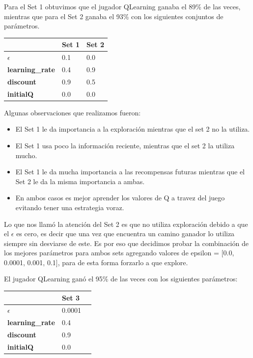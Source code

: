 Para el Set 1 obtuvimos que el jugador QLearning ganaba el 89\% de las veces, mientras que para el Set 2 ganaba el 93\% con los siguientes conjuntos de parámetros.

\begin{center}
    \begin{tabular}{| l | l | l |}
    \hline
     					    &  \textbf{Set 1} & \textbf{Set 2} \\ \hline
    \textbf{$\epsilon$}     &  0.1   		  & 0.0   \\
    \textbf{learning\_rate} &  0.4   		  & 0.9   \\
    \textbf{discount}       &  0.9  		  & 0.5   \\
	\textbf{initialQ} 		&  0.0   		  & 0.0   \\
    \hline
    \end{tabular}
\end{center}

Algunas observaciones que realizamos fueron:
\begin{itemize}
\item El Set 1 le da importancia a la exploración mientras que el set 2 no la utiliza.
\item El Set 1 usa poco la información reciente, mientras que el set 2 la utiliza mucho.
\item El Set 1 le da mucha importancia a las recompensas futuras mientras que el Set 2 le da la misma importancia a ambas.
\item En ambos casos es mejor aprender los valores de Q a travez del juego evitando tener una estrategia voraz.
\end{itemize}

Lo que nos llamó la atención del Set 2 es que no utiliza exploración debido a que el $\epsilon$ es cero, es decir que una vez que encuentra un camino ganador lo utiliza siempre sin desviarse de este.
Es por eso que decidimos probar la combinación de los mejores parámetros para ambos sets agregando valores de epsilon = $[$0.0, 0.0001, 0.001, 0.1$]$, para de esta forma forzarlo a que explore.

El jugador QLearning ganó el 95\% de las veces con los siguientes parámetros:
\begin{center}
    \begin{tabular}{| l | l | l |}
    \hline
     					    &  \textbf{Set 3} \\ \hline
    \textbf{$\epsilon$}     &  0.0001  		  \\
    \textbf{learning\_rate} &  0.4   		  \\
    \textbf{discount}       &  0.9  		  \\
	\textbf{initialQ} 		&  0.0   		  \\
    \hline
    \end{tabular}
\end{center}


